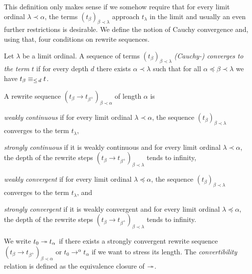 This definition only makes sense if we somehow require that for every limit
ordinal $\lambda \prec \alpha$, the terms $(t_\beta)_{\beta \prec
  \lambda}$ approach $t_\lambda$ in the limit and usually an even
further restrictions is desirable. We define the notion of Cauchy
convergence and, using that, four conditions on rewrite sequences.

\begin{definition}\label{def:cauchy}%
  Let $\lambda$ be a limit ordinal. A sequence of terms
  $(t_\beta)_{\beta \prec \lambda}$ \emph{(Cauchy-) converges to the
    term} $t$ if for every depth $d$ there exists $\alpha \prec
  \lambda$ such that for all $\alpha \preceq \beta \prec \lambda$ we
  have $t_\beta \equiv_{\le \, d} t$.
\end{definition}

\begin{definition}\label{def:convergence}%
A rewrite sequence $(t_\beta \rightarrow t_{\beta^+})_{\beta \prec
  \alpha}$ of length $\alpha$ is
\begin{compactenum}
  \item
    \emph{weakly continuous} if for every limit ordinal $\lambda \prec
    \alpha$, the sequence $(t_\beta)_{\beta \prec \lambda}$ converges
    to the term $t_\lambda$,
  \item
    \emph{strongly continuous} if it is weakly continuous and for every limit
    ordinal $\lambda \prec \alpha$, the depth of the rewrite steps $(t_\beta
    \rightarrow t_{\beta^+})_{\beta \prec \lambda}$ tends to infinity,
  \item
    \emph{weakly convergent} if for every limit ordinal $\lambda
    \preceq \alpha$, the sequence $(t_\beta)_{\beta \prec \lambda}$
    converges to the term $t_\lambda$, and
  \item
    \emph{strongly convergent} if it is weakly convergent and for
    every limit ordinal $\lambda \preceq \alpha$, the depth of the
    rewrite steps $(t_\beta \rightarrow t_{\beta^+})_{\beta \prec
      \lambda}$ tends to infinity.
\end{compactenum}
\end{definition}

We write $t_0 \twoheadrightarrow t_\alpha$ if there exists a strongly
convergent rewrite sequence $(t_\beta \rightarrow t_{\beta^+})_{\beta
  \prec \alpha}$ or $t_0 \rightarrow^\alpha t_\alpha$ if we want to
stress its length. The \emph{convertibility} relation is defined as
the equivalence closure of $\twoheadrightarrow$.


